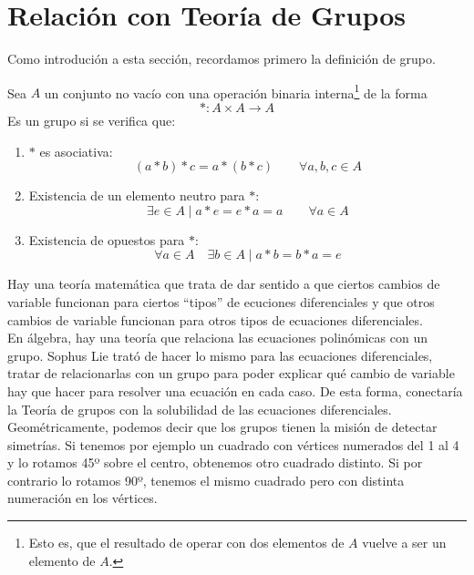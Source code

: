 \section{Relación con Teoría de Grupos}
Como introdución a esta sección, recordamos primero la definición de grupo.
\begin{definicion}[Grupo]
    Sea $A$ un conjunto no vacío con una operación binaria interna\footnote{Esto es, que el resultado de operar con dos elementos de $A$ vuelve a ser un elemento de $A$.} de la forma
\begin{equation*}
    \ast:A\times A\rightarrow A
\end{equation*}
Es un grupo si se verifica que:
\begin{enumerate}[label=(\arabic*)]
    \item $\ast$ es asociativa: 
        \begin{equation*}
            (a\ast b)\ast c = a\ast (b\ast c) \qquad \forall a,b,c\in A
        \end{equation*}
    \item Existencia de un elemento neutro para $\ast$:
        \begin{equation*}
            \exists e\in A \mid a\ast e = e\ast a = a \qquad \forall a\in A
        \end{equation*}
    \item Existencia de opuestos para $\ast$:
        \begin{equation*}
            \forall a\in A \quad \exists b\in A \mid a\ast b = b\ast a = e
        \end{equation*}
\end{enumerate}
\end{definicion}

Hay una teoría matemática que trata de dar sentido a que ciertos cambios de variable funcionan para ciertos ``tipos'' de ecuciones diferenciales y que otros cambios de variable funcionan para otros tipos de ecuaciones diferenciales.\\

En álgebra, hay una teoría que relaciona las ecuaciones polinómicas con un grupo. Sophus Lie trató de hacer lo mismo para las ecuaciones diferenciales, tratar de relacionarlas con un grupo para poder explicar qué cambio de variable hay que hacer para resolver una ecuación en cada caso. De esta forma, conectaría la Teoría de grupos con la solubilidad de las ecuaciones diferenciales.\\

Geométricamente, podemos decir que los grupos tienen la misión de detectar simetrías. Si tenemos por ejemplo un cuadrado con vértices numerados del 1 al 4 y lo rotamos 45º sobre el centro, obtenemos otro cuadrado distinto. Si por contrario lo rotamos 90º, tenemos el mismo cuadrado pero con distinta numeración en los vértices.

